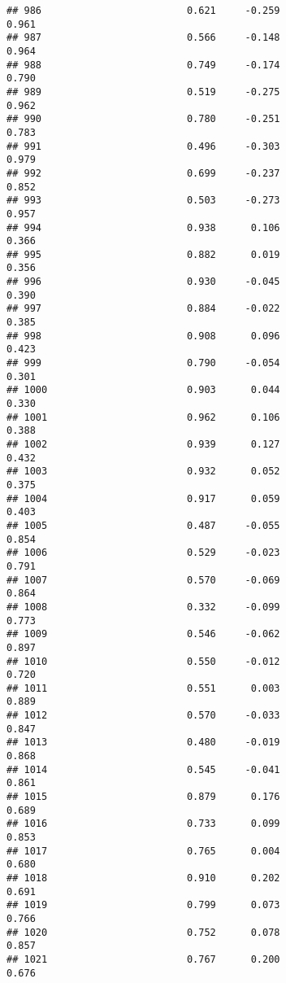 \documentclass[
]{article}
\begin{document}
\begin{verbatim}
## 986                         0.621     -0.259                     0.961
## 987                         0.566     -0.148                     0.964
## 988                         0.749     -0.174                     0.790
## 989                         0.519     -0.275                     0.962
## 990                         0.780     -0.251                     0.783
## 991                         0.496     -0.303                     0.979
## 992                         0.699     -0.237                     0.852
## 993                         0.503     -0.273                     0.957
## 994                         0.938      0.106                     0.366
## 995                         0.882      0.019                     0.356
## 996                         0.930     -0.045                     0.390
## 997                         0.884     -0.022                     0.385
## 998                         0.908      0.096                     0.423
## 999                         0.790     -0.054                     0.301
## 1000                        0.903      0.044                     0.330
## 1001                        0.962      0.106                     0.388
## 1002                        0.939      0.127                     0.432
## 1003                        0.932      0.052                     0.375
## 1004                        0.917      0.059                     0.403
## 1005                        0.487     -0.055                     0.854
## 1006                        0.529     -0.023                     0.791
## 1007                        0.570     -0.069                     0.864
## 1008                        0.332     -0.099                     0.773
## 1009                        0.546     -0.062                     0.897
## 1010                        0.550     -0.012                     0.720
## 1011                        0.551      0.003                     0.889
## 1012                        0.570     -0.033                     0.847
## 1013                        0.480     -0.019                     0.868
## 1014                        0.545     -0.041                     0.861
## 1015                        0.879      0.176                     0.689
## 1016                        0.733      0.099                     0.853
## 1017                        0.765      0.004                     0.680
## 1018                        0.910      0.202                     0.691
## 1019                        0.799      0.073                     0.766
## 1020                        0.752      0.078                     0.857
## 1021                        0.767      0.200                     0.676

\end{verbatim}
\end{document}
